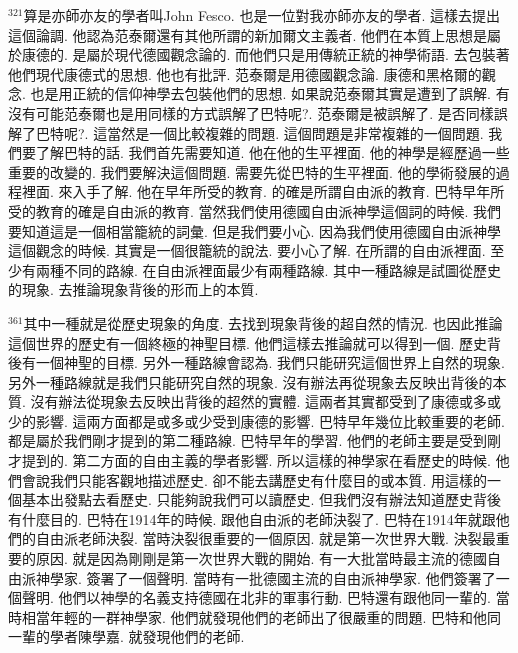 \documentclass{book}
\begin{document}
$^{321}$算是亦師亦友的學者叫John Fesco.
也是一位對我亦師亦友的學者.
這樣去提出這個論調.
他認為范泰爾還有其他所謂的新加爾文主義者.
他們在本質上思想是屬於康德的.
是屬於現代德國觀念論的.
而他們只是用傳統正統的神學術語.
去包裝著他們現代康德式的思想.
他也有批評.
范泰爾是用德國觀念論.
康德和黑格爾的觀念.
也是用正統的信仰神學去包裝他們的思想.
如果說范泰爾其實是遭到了誤解.
有沒有可能范泰爾也是用同樣的方式誤解了巴特呢?.
范泰爾是被誤解了.
是否同樣誤解了巴特呢?.
這當然是一個比較複雜的問題.
這個問題是非常複雜的一個問題.
我們要了解巴特的話.
我們首先需要知道.
他在他的生平裡面.
他的神學是經歷過一些重要的改變的.
我們要解決這個問題.
需要先從巴特的生平裡面.
他的學術發展的過程裡面.
來入手了解.
他在早年所受的教育.
的確是所謂自由派的教育.
巴特早年所受的教育的確是自由派的教育.
當然我們使用德國自由派神學這個詞的時候.
我們要知道這是一個相當籠統的詞彙.
但是我們要小心.
因為我們使用德國自由派神學這個觀念的時候.
其實是一個很籠統的說法.
要小心了解.
在所謂的自由派裡面.
至少有兩種不同的路線.
在自由派裡面最少有兩種路線.
其中一種路線是試圖從歷史的現象.
去推論現象背後的形而上的本質.

$^{361}$其中一種就是從歷史現象的角度.
去找到現象背後的超自然的情況.
也因此推論這個世界的歷史有一個終極的神聖目標.
他們這樣去推論就可以得到一個.
歷史背後有一個神聖的目標.
另外一種路線會認為.
我們只能研究這個世界上自然的現象.
另外一種路線就是我們只能研究自然的現象.
沒有辦法再從現象去反映出背後的本質.
沒有辦法從現象去反映出背後的超然的實體.
這兩者其實都受到了康德或多或少的影響.
這兩方面都是或多或少受到康德的影響.
巴特早年幾位比較重要的老師.
都是屬於我們剛才提到的第二種路線.
巴特早年的學習.
他們的老師主要是受到剛才提到的.
第二方面的自由主義的學者影響.
所以這樣的神學家在看歷史的時候.
他們會說我們只能客觀地描述歷史.
卻不能去講歷史有什麼目的或本質.
用這樣的一個基本出發點去看歷史.
只能夠說我們可以讀歷史.
但我們沒有辦法知道歷史背後有什麼目的.
巴特在1914年的時候.
跟他自由派的老師決裂了.
巴特在1914年就跟他們的自由派老師決裂.
當時決裂很重要的一個原因.
就是第一次世界大戰.
決裂最重要的原因.
就是因為剛剛是第一次世界大戰的開始.
有一大批當時最主流的德國自由派神學家.
簽署了一個聲明.
當時有一批德國主流的自由派神學家.
他們簽署了一個聲明.
他們以神學的名義支持德國在北非的軍事行動.
巴特還有跟他同一輩的.
當時相當年輕的一群神學家.
他們就發現他們的老師出了很嚴重的問題.
巴特和他同一輩的學者陳學嘉.
就發現他們的老師.
\end{document}
